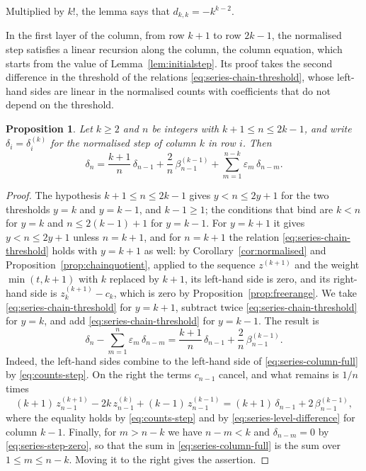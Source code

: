 \documentclass{amsart}
\newtheorem{proposition}[theorem]{Proposition}
\theoremstyle{definition}
\theoremstyle{remark}
\numberwithin{equation}{section}
\begin{document}
Multiplied by $k!$, the lemma says that $d_{k,k}=-k^{k-2}$.

In the first layer of the column, from row $k+1$ to row $2k-1$, the
normalised step satisfies a linear recursion along the column, the column
equation, which starts from the value of Lemma~\ref{lem:initialstep}. Its
proof takes the second difference in the threshold of the relations
\eqref{eq:series-chain-threshold}, whose left-hand sides are linear in the
normalised counts with coefficients that do not depend on the threshold.

\begin{proposition}\label{prop:columnequation}
Let $k\ge2$ and $n$ be integers with $k+1\le n\le2k-1$, and write
$\delta_i=\delta^{(k)}_i$ for the normalised step of column $k$ in row $i$.
Then
\[
\delta_n=\frac{k+1}{n}\,\delta_{n-1}+\frac{2}{n}\,\beta^{(k-1)}_{n-1}
+\sum_{m=1}^{n-k}\varepsilon_m\,\delta_{n-m} .
\]
\end{proposition}

\begin{proof}
The hypothesis $k+1\le n\le2k-1$ gives $y<n\le2y+1$ for the two thresholds
$y=k$ and $y=k-1$, and $k-1\ge1$; the conditions that bind are $k<n$ for
$y=k$ and $n\le2(k-1)+1$ for $y=k-1$. For $y=k+1$ it gives $y<n\le2y+1$
unless $n=k+1$, and for $n=k+1$ the relation
\eqref{eq:series-chain-threshold} holds with $y=k+1$ as well: by
Corollary~\ref{cor:normalised} and Proposition~\ref{prop:chainquotient},
applied to the sequence $z^{(k+1)}$ and the weight $\min(t,k+1)$ with $k$
replaced by $k+1$, its left-hand side is zero, and its right-hand side is
$z^{(k+1)}_k-c_k$, which is zero by Proposition~\ref{prop:freerange}. We take
\eqref{eq:series-chain-threshold} for $y=k+1$, subtract twice
\eqref{eq:series-chain-threshold} for $y=k$, and add
\eqref{eq:series-chain-threshold} for $y=k-1$. The result is
\begin{equation}\label{eq:series-column-full}
\delta_n-\sum_{m=1}^{n}\varepsilon_m\,\delta_{n-m}
=\frac{k+1}{n}\,\delta_{n-1}+\frac{2}{n}\,\beta^{(k-1)}_{n-1} .
\end{equation}
Indeed, the left-hand sides combine to the left-hand side of
\eqref{eq:series-column-full} by \eqref{eq:counts-step}. On the
right the terms $c_{n-1}$ cancel, and what remains is $1/n$ times
\[
(k+1)\,z^{(k+1)}_{n-1}-2k\,z^{(k)}_{n-1}+(k-1)\,z^{(k-1)}_{n-1}
=(k+1)\,\delta_{n-1}+2\,\beta^{(k-1)}_{n-1},
\]
where the equality holds by \eqref{eq:counts-step} and by
\eqref{eq:series-level-difference} for column $k-1$. Finally, for
$m>n-k$ we have $n-m<k$ and $\delta_{n-m}=0$ by \eqref{eq:series-step-zero},
so that the sum in \eqref{eq:series-column-full} is the sum over
$1\le m\le n-k$. Moving it to the right gives the assertion.
\end{proof}
\end{document}
